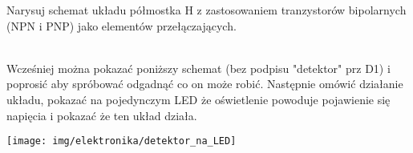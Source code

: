 \documentclass{pdfBooklets}
\begin{document}

\begin{Zadanie}{}{}
Narysuj schemat układu półmostka H z zastosowaniem tranzystorów bipolarnych (NPN i PNP) jako elementów przełączających.
\end{Zadanie}



% 

\begin{teacherOnly}
\noindent\begin{minipage}[t]{0.6\textwidth}
\\
Wcześniej można pokazać poniższy schemat (bez podpisu "detektor" prz D1) i poprosić aby spróbować odgadnąć co on może robić.
Następnie omówić działanie układu, pokazać na pojedynczym LED że oświetlenie powoduje pojawienie się napięcia i pokazać że ten układ działa.
\end{minipage}
\hfill
\begin{minipage}[t]{0.35\textwidth}
\vspace{-10pt}
\texttt{[image: img/elektronika/detektor\_na\_LED]}
\end{minipage}
\end{teacherOnly}
\end{document}

